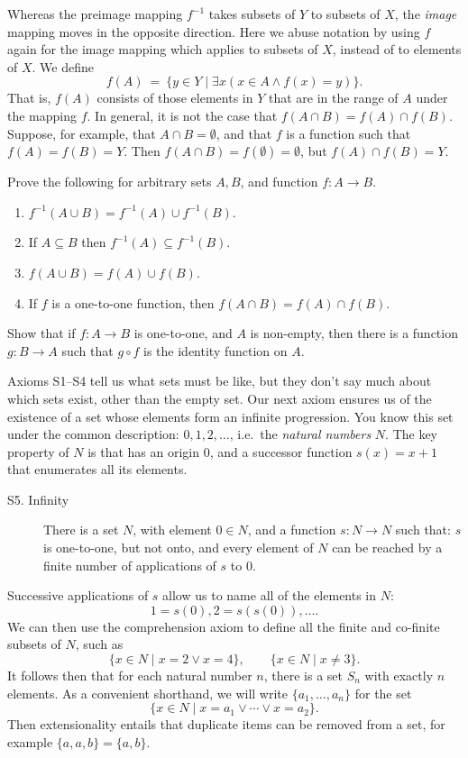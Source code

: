 Whereas the preimage mapping $f^{-1}$ takes subsets of $Y$ to subsets
of $X$, the \emph{image} mapping moves in the opposite direction.  Here we
abuse notation by using $f$ again for the image mapping which applies
to subsets of $X$, instead of to elements of $X$.  We define
\[ f(A) \: = \: \{ y\in Y \mid \exists x(x\in A\wedge f(x)=y) \} . \]
That is, $f(A)$ consists of those elements in $Y$ that are in the
range of $A$ under the mapping $f$.  In general, it is not the case
that $f(A\cap B)=f(A)\cap f(B)$.  Suppose, for example, that
$A\cap B=\emptyset$, and that $f$ is a function such that
$f(A)=f(B)=Y$.  Then $f(A\cap B)=f(\emptyset )=\emptyset$, but
$f(A)\cap f(B)=Y$.

\begin{exercises} Prove the following for arbitrary sets $A,B$, and
  function $f:A\to B$.
   \begin{enumerate}
   \item $f^{-1}(A\cup B)=f^{-1}(A)\cup f^{-1}(B)$.  
   \item If $A\subseteq B$ then $f^{-1}(A)\subseteq f^{-1}(B)$.
   \item $f(A\cup B)=f(A)\cup f(B)$.
   \item If $f$ is a one-to-one function, then $f(A\cap B)=f(A)\cap f(B)$.
   \end{enumerate}
 \end{exercises}

\begin{exercise} Show that if $f:A\to B$ is one-to-one, and $A$ is
  non-empty, then there is a function $g:B\to A$ such that $g\circ f$
  is the identity function on $A$. \end{exercise}
 
Axioms S1--S4 tell us what sets must be like, but they don't say much
about which sets exist, other than the empty set.  Our next axiom
ensures us of the existence of a set whose elements form an infinite
progression.  You know this set under the common description:
$0,1,2,\dots $, i.e.\ the \emph{natural numbers} $N$.  The key
property of $N$ is that has an origin $0$, and a successor function
$s(x)=x+1$ that enumerates all its elements.
\begin{description}  
\item[S5. Infinity] There is a set $N$, with element $0\in N$, and a
  function $s:N\to N$ such that: $s$ is one-to-one, but not onto, and
  every element of $N$ can be reached by a finite number of
  applications of $s$ to $0$. \end{description} Successive
applications of $s$ allow us to name all of the elements in $N$:
\[ 1=s(0),2=s(s(0)),\dots .\] We can then use the comprehension axiom
to define all the finite and co-finite subsets of $N$, such as
\[ \{ x\in N \mid x=2\vee x=4 \} ,\qquad \{ x\in N \mid x\neq 3 \} .\]
It follows then that for each natural number $n$, there is a set $S_n$
with exactly $n$ elements.  As a convenient shorthand, we will write
$\{ a_1,\dots ,a_n\}$ for the set
\[ \{ x\in N \mid x=a_1\vee\cdots \vee x=a_2 \} .\] Then
extensionality entails that duplicate items can be removed from a set,
for example $\{ a,a,b \}=\{ a,b\}$.

